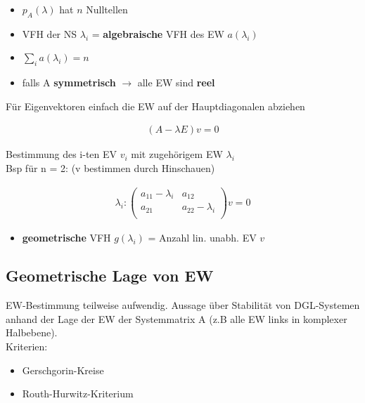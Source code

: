 \documentclass[10pt,a4paper]{article}
\begin{document}
  \begin{itemize}
    \item $p_A(\lambda)$ hat $n$ Nulltellen
    \item VFH der NS $\lambda_i$ = \textbf{algebraische} VFH des EW $a(\lambda_i)$ 
    \item $\sum_i a(\lambda_i) = n$ 
    \item falls A \textbf{symmetrisch} $\rightarrow$ alle EW sind \textbf{reel}
  \end{itemize}
Für Eigenvektoren einfach die EW auf der Hauptdiagonalen abziehen
  \begin{mdframed}[style=exercise]
    \begin{align}
        (A-\lambda E)v = 0
    \end{align}
  \end{mdframed}
Bestimmung des i-ten EV $v_i$ mit zugehörigem EW $\lambda_i$ \\
Bsp für n = 2: (v bestimmen durch Hinschauen)
  \begin{mdframed}[style=exercise]
    \begin{align}
        \lambda_i : 
        \begin{pmatrix}
            a_{11}-\lambda_i & a_{12} \\
            a_{21} & a_{22}-\lambda_i \\
        \end{pmatrix} v = 0
    \end{align}
  \end{mdframed}

  \begin{itemize}
    \item \textbf{geometrische} VFH $g(\lambda_i)$ = Anzahl lin. unabh. EV $v$
  \end{itemize}

  \subsection{Geometrische Lage von EW}
  EW-Bestimmung teilweise aufwendig. Aussage über Stabilität von DGL-Systemen anhand der Lage der EW der Systemmatrix A 
  (z.B alle EW links in komplexer Halbebene).\\
  Kriterien:
  \begin{itemize}
    \item Gerschgorin-Kreise 
    \item Routh-Hurwitz-Kriterium
  \end{itemize}
\end{document}
